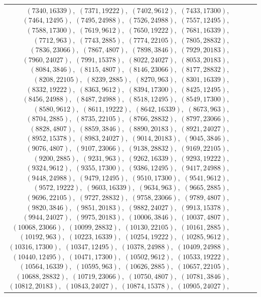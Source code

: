 \documentclass[11pt]{article}
\begin{document}
\begin{longtable}{@{}rrl>{\raggedright\arraybackslash}p{}@{}}
$(7340,16339)$,\allowbreak\ $(7371,19222)$,\allowbreak\ $(7402,9612)$,\allowbreak\ $(7433,17300)$,\allowbreak\ $(7464,12495)$,\allowbreak\ $(7495,24988)$,\allowbreak\ $(7526,24988)$,\allowbreak\ $(7557,12495)$,\allowbreak\ $(7588,17300)$,\allowbreak\ $(7619,9612)$,\allowbreak\ $(7650,19222)$,\allowbreak\ $(7681,16339)$,\allowbreak\ $(7712,963)$,\allowbreak\ $(7743,2885)$,\allowbreak\ $(7774,22105)$,\allowbreak\ $(7805,28832)$,\allowbreak\ $(7836,23066)$,\allowbreak\ $(7867,4807)$,\allowbreak\ $(7898,3846)$,\allowbreak\ $(7929,20183)$,\allowbreak\ $(7960,24027)$,\allowbreak\ $(7991,15378)$,\allowbreak\ $(8022,24027)$,\allowbreak\ $(8053,20183)$,\allowbreak\ $(8084,3846)$,\allowbreak\ $(8115,4807)$,\allowbreak\ $(8146,23066)$,\allowbreak\ $(8177,28832)$,\allowbreak\ $(8208,22105)$,\allowbreak\ $(8239,2885)$,\allowbreak\ $(8270,963)$,\allowbreak\ $(8301,16339)$,\allowbreak\ $(8332,19222)$,\allowbreak\ $(8363,9612)$,\allowbreak\ $(8394,17300)$,\allowbreak\ $(8425,12495)$,\allowbreak\ $(8456,24988)$,\allowbreak\ $(8487,24988)$,\allowbreak\ $(8518,12495)$,\allowbreak\ $(8549,17300)$,\allowbreak\ $(8580,9612)$,\allowbreak\ $(8611,19222)$,\allowbreak\ $(8642,16339)$,\allowbreak\ $(8673,963)$,\allowbreak\ $(8704,2885)$,\allowbreak\ $(8735,22105)$,\allowbreak\ $(8766,28832)$,\allowbreak\ $(8797,23066)$,\allowbreak\ $(8828,4807)$,\allowbreak\ $(8859,3846)$,\allowbreak\ $(8890,20183)$,\allowbreak\ $(8921,24027)$,\allowbreak\ $(8952,15378)$,\allowbreak\ $(8983,24027)$,\allowbreak\ $(9014,20183)$,\allowbreak\ $(9045,3846)$,\allowbreak\ $(9076,4807)$,\allowbreak\ $(9107,23066)$,\allowbreak\ $(9138,28832)$,\allowbreak\ $(9169,22105)$,\allowbreak\ $(9200,2885)$,\allowbreak\ $(9231,963)$,\allowbreak\ $(9262,16339)$,\allowbreak\ $(9293,19222)$,\allowbreak\ $(9324,9612)$,\allowbreak\ $(9355,17300)$,\allowbreak\ $(9386,12495)$,\allowbreak\ $(9417,24988)$,\allowbreak\ $(9448,24988)$,\allowbreak\ $(9479,12495)$,\allowbreak\ $(9510,17300)$,\allowbreak\ $(9541,9612)$,\allowbreak\ $(9572,19222)$,\allowbreak\ $(9603,16339)$,\allowbreak\ $(9634,963)$,\allowbreak\ $(9665,2885)$,\allowbreak\ $(9696,22105)$,\allowbreak\ $(9727,28832)$,\allowbreak\ $(9758,23066)$,\allowbreak\ $(9789,4807)$,\allowbreak\ $(9820,3846)$,\allowbreak\ $(9851,20183)$,\allowbreak\ $(9882,24027)$,\allowbreak\ $(9913,15378)$,\allowbreak\ $(9944,24027)$,\allowbreak\ $(9975,20183)$,\allowbreak\ $(10006,3846)$,\allowbreak\ $(10037,4807)$,\allowbreak\ $(10068,23066)$,\allowbreak\ $(10099,28832)$,\allowbreak\ $(10130,22105)$,\allowbreak\ $(10161,2885)$,\allowbreak\ $(10192,963)$,\allowbreak\ $(10223,16339)$,\allowbreak\ $(10254,19222)$,\allowbreak\ $(10285,9612)$,\allowbreak\ $(10316,17300)$,\allowbreak\ $(10347,12495)$,\allowbreak\ $(10378,24988)$,\allowbreak\ $(10409,24988)$,\allowbreak\ $(10440,12495)$,\allowbreak\ $(10471,17300)$,\allowbreak\ $(10502,9612)$,\allowbreak\ $(10533,19222)$,\allowbreak\ $(10564,16339)$,\allowbreak\ $(10595,963)$,\allowbreak\ $(10626,2885)$,\allowbreak\ $(10657,22105)$,\allowbreak\ $(10688,28832)$,\allowbreak\ $(10719,23066)$,\allowbreak\ $(10750,4807)$,\allowbreak\ $(10781,3846)$,\allowbreak\ $(10812,20183)$,\allowbreak\ $(10843,24027)$,\allowbreak\ $(10874,15378)$,\allowbreak\ $(10905,24027)$,\allowbreak\ 
\end{longtable}
\end{document}
